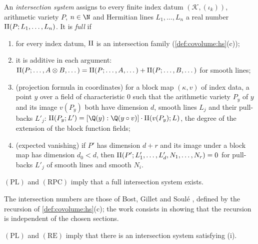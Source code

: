 \begin{definition}\label{pf:sh-flag:deffull}
An \emph{intersection system} assigns to every finite index datum $(\mathcal K,(\iota_k))$, arithmetic variety $P$, $n\in\N$ and Hermitian
lines $L_1,\dots,L_n$ a real number $\mathrm{II}(P;L_1,\dots,L_n)$. It is \emph{full} if
\begin{enumerate}[label=(\roman*)]
\item for every index datum, $\mathrm{II}$ is an intersection family (\cref{def:covolume:hs}(c));
\item it is additive in each argument: $\mathrm{II}(P;\dots,A\otimes B,\dots)=\mathrm{II}(P;\dots,A,\dots)+\mathrm{II}(P;\dots,B,\dots)$ for smooth
lines;
\item (projection formula in coordinates) for a block map $(\kappa,v)$ of index data, a point $y$ over a field of characteristic $0$
such that the arithmetic variety $P_y$ of $y$ and its image $v(P_y)$ both have dimension $d$, smooth lines $L_j$ and their pull-backs
$L'_j$: $\shflagII(P_y;L')=[\Q(y):\Q(y\circ v)]\cdot\shflagII(v(P_y);L)$, the degree of the extension of the block function fields;
\item (expected vanishing) if $P'$ has dimension $d+r$ and its image under a block map has dimension $d_0<d$, then
$\mathrm{II}(P';L'_1,\dots,L'_d,N_1,\dots,N_r)=0$ for pull-backs $L'_j$ of smooth lines and smooth $N_i$.
\end{enumerate}
\end{definition}

\begin{theorem}\label{pf:sh-flag:ais}
$(\mathrm{PL})$ and $(\mathrm{RPC})$ imply that a full intersection system exists.
\end{theorem}

The intersection numbers are those of Bost, Gillet and Soul\'e \cite{BostGilletSoule1994,GilletSoule1990}, defined by the recursion of
\cref{def:covolume:hs}(c); the work consists in showing that the recursion is independent of the chosen sections.

\begin{proposition}\label{pf:sh-flag:iexists}
$(\mathrm{PL})$ and $(\mathrm{RE})$ imply that there is an intersection system satisfying (i).
\end{proposition}

